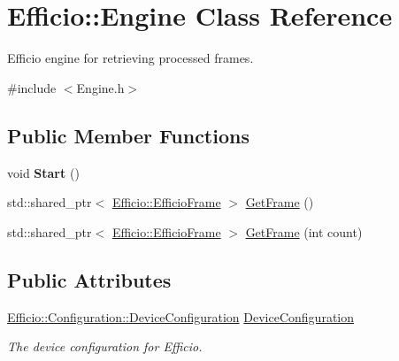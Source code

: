 \hypertarget{class_efficio_1_1_engine}{}\section{Efficio\+:\+:Engine Class Reference}
\label{class_efficio_1_1_engine}


Efficio engine for retrieving processed frames.  




{\ttfamily \#include $<$Engine.\+h$>$}

\subsection*{Public Member Functions}
\begin{DoxyCompactItemize}
\item 
void {\bfseries Start} ()\hypertarget{class_efficio_1_1_engine_a3b6e5c963c14df6e902f72df6a521fd1}{}\label{class_efficio_1_1_engine_a3b6e5c963c14df6e902f72df6a521fd1}

\item 
std\+::shared\+\_\+ptr$<$ \hyperlink{class_efficio_1_1_efficio_frame}{Efficio\+::\+Efficio\+Frame} $>$ \hyperlink{class_efficio_1_1_engine_a4f46a611516d157a32005a860128f9dc}{Get\+Frame} ()
\item 
std\+::shared\+\_\+ptr$<$ \hyperlink{class_efficio_1_1_efficio_frame}{Efficio\+::\+Efficio\+Frame} $>$ \hyperlink{class_efficio_1_1_engine_a9f81b122b1c2f768110675a79a842117}{Get\+Frame} (int count)
\end{DoxyCompactItemize}
\subsection*{Public Attributes}
\begin{DoxyCompactItemize}
\item 
\hyperlink{class_efficio_1_1_configuration_1_1_device_configuration}{Efficio\+::\+Configuration\+::\+Device\+Configuration} \hyperlink{class_efficio_1_1_engine_afbaba10c9c508bdcc16625a2e51a6148}{Device\+Configuration}\hypertarget{class_efficio_1_1_engine_afbaba10c9c508bdcc16625a2e51a6148}{}\label{class_efficio_1_1_engine_afbaba10c9c508bdcc16625a2e51a6148}

\begin{DoxyCompactList}\small\item\em The device configuration for Efficio. \end{DoxyCompactList}\end{DoxyCompactItemize}


